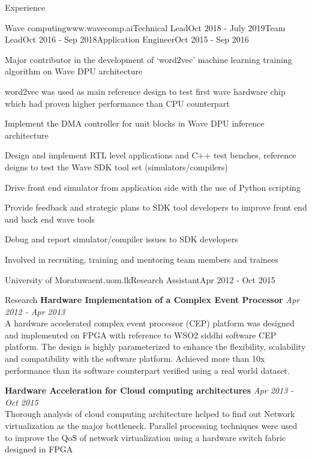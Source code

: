 \documentclass[
11pt, %
]{./../assets/resume} %
\begin{document}
\begin{rSection}{Experience}
\begin{rSubsectionM}{Wave computing}{www.wavecomp.ai}{Technical Lead}{Oct 2018 - July 2019}{Team Lead}{Oct 2016 - Sep 2018}{Application Engineer}{Oct 2015 - Sep 2016}
		\item Major contributor in the development of `word2vec' machine learning training algorithm on Wave DPU architecture
		\item word2vec was used as main reference design to test first wave hardware chip which had proven higher performance than CPU counterpart
		\item Implement the DMA controller for unit blocks in Wave DPU inference architecture
		\item Design and implement RTL level applications and C++ test benches, reference deigns to test the Wave SDK tool set (simulators/compilers)
		\item Drive front end simulator from application side with the use of Python scripting
		\item Provide feedback and strategic plans to SDK tool developers to improve front end and back end wave tools
		\item Debug and report simulator/compiler issues to SDK developers
		\item Involved in recruiting, training and mentoring team members and trainees
	\end{rSubsectionM}
	\begin{rSubsectionSimpleX}{University of Moratuwa}{ent.uom.lk}{Research Assistant}{Apr 2012 - Oct 2015}
	\end{rSubsectionSimpleX}
	
\end{rSection}

\begin{rSection}{Research}
	\textbf{Hardware Implementation of a Complex Event Processor} \hfill \textit{Apr 2012 - Apr 2013}\\
	A hardware accelerated complex event processor (CEP) platform was designed and implemented on FPGA with reference to WSO2 siddhi software CEP platform.
	The design is highly parameterized to enhance the flexibility, scalability and compatibility with the software platform.
	Achieved more than 10x performance than its software counterpart verified using a real world dataset.

	
	\textbf{Hardware Acceleration for Cloud computing architectures} \hfill \textit{Apr 2013 - Oct 2015}\\
	Thorough analysis of cloud computing architecture helped to find out Network virtualization as the major bottleneck.
	Parallel processing techniques were used to improve the QoS of network virtualization using a hardware switch fabric designed in FPGA

	
\end{rSection}
\end{document}
